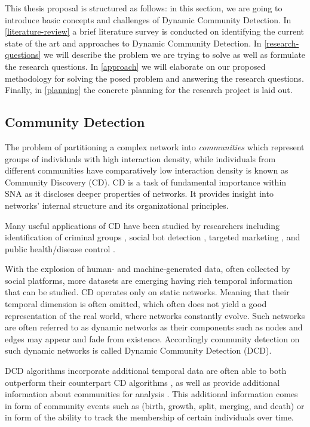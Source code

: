 \documentclass[
acmsmall,
nonacm,
screen,
acmthm]{../../scripts/pandoc/templates/acmart}
\begin{document}
This thesis proposal is structured as follows: in this section, we are
going to introduce basic concepts and challenges of Dynamic Community
Detection. In \cref{literature-review} a brief literature survey is
conducted on identifying the current state of the art and approaches to
Dynamic Community Detection. In \cref{research-questions} we will
describe the problem we are trying to solve as well as formulate the
research questions. In \cref{approach} we will elaborate on our proposed
methodology for solving the posed problem and answering the research
questions. Finally, in \cref{planning} the concrete planning for the
research project is laid out.

\hypertarget{community-detection}{%
\subsection{Community Detection}\label{community-detection}}

The problem of partitioning a complex network into \emph{communities}
which represent groups of individuals with high interaction density,
while individuals from different communities have comparatively low
interaction density is known as Community Discovery (CD). CD is a task
of fundamental importance within SNA as it discloses deeper properties
of networks. It provides insight into networks' internal structure and
its organizational principles.

Many useful applications of CD have been studied by researchers
including identification of criminal groups
\citep{sarvariConstructingAnalyzingCriminal2014}, social bot detection
\citep{karatasReviewSocialBot2017}, targeted marketing
\citep{mosadeghUsingSocialNetwork2011}, and public health/disease
control \citep{salatheDynamicsControlDiseases2010}.

With the explosion of human- and machine-generated data, often collected
by social platforms, more datasets are emerging having rich temporal
information that can be studied. CD operates only on static networks.
Meaning that their temporal dimension is often omitted, which often does
not yield a good representation of the real world, where networks
constantly evolve. Such networks are often referred to as dynamic
networks as their components such as nodes and edges may appear and fade
from existence. Accordingly community detection on such dynamic networks
is called Dynamic Community Detection (DCD).

DCD algorithms incorporate additional temporal data are often able to
both outperform their counterpart CD algorithms
\citep{granellBenchmarkModelAssess2015, liuCommunityDetectionMultiPartite2016, faniUserCommunityDetection2020, rossettiANGELEfficientEffective2020},
as well as provide additional information about communities for analysis
\citep{pallaQuantifyingSocialGroup2007}. This additional information
comes in form of community events such as (birth, growth, split,
merging, and death) or in form of the ability to track the membership of
certain individuals over time.
\end{document}

